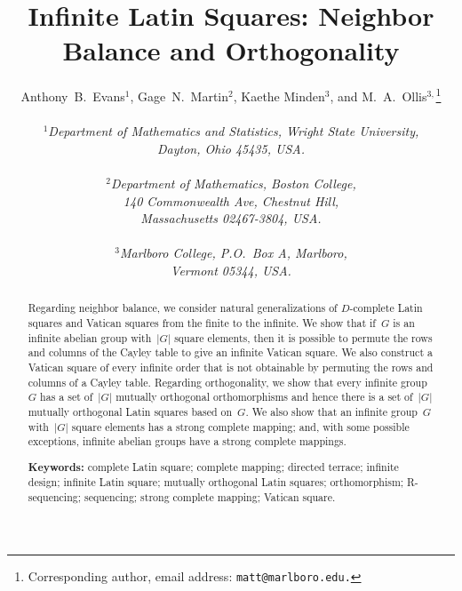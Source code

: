 \documentclass[12pt,a4paper]{article}
\begin{document}
\title{Infinite Latin Squares: Neighbor Balance and Orthogonality}

\author{Anthony~B.~Evans$^{1}$, Gage~N.~Martin$^{2}$, Kaethe Minden$^3$, and M.~A.~Ollis$^{3,}$\footnote{Corresponding author, email address: \texttt{matt@marlboro.edu.}}   \\
              \\
                {\it ${}^1$Department of Mathematics and Statistics, Wright State University,} \\    
              {\it Dayton, Ohio 45435, USA.} 
              \\
              \\
              {\it ${}^2$Department of Mathematics, Boston College,} \\
               {\it 140 Commonwealth Ave, Chestnut Hill,  } \\
              {\it  Massachusetts 02467-3804, USA.}
              \\
              \\
              {\it ${}^3$Marlboro College, P.O.~Box A, Marlboro,} \\    
              {\it Vermont 05344, USA.} }


\maketitle



\begin{abstract}
Regarding neighbor balance, we consider natural generalizations of $D$-complete Latin squares and Vatican squares from the finite to the infinite.   We show that if~$G$ is an infinite abelian group with~$|G|$ square elements, then it is possible to permute the rows and columns of the Cayley table to give an infinite Vatican square.  We also construct a Vatican square of every infinite order that is not obtainable by permuting the rows and columns of a Cayley table.  Regarding orthogonality, we show that every infinite group~$G$ has a set of~$|G|$ mutually orthogonal orthomorphisms and hence there is a set of~$|G|$ mutually orthogonal Latin squares based on~$G$.  We also show that an infinite group~$G$ with~$|G|$ square elements has a strong complete mapping; and, with some possible exceptions, infinite abelian groups have a strong complete mappings.


\vspace{3mm}
\noindent
{\bf Keywords:} complete Latin square; complete mapping; directed terrace; infinite design; infinite Latin square; mutually orthogonal Latin squares; orthomorphism; R-sequencing; sequencing; strong complete mapping; Vatican square.
\end{abstract}
\end{document}
